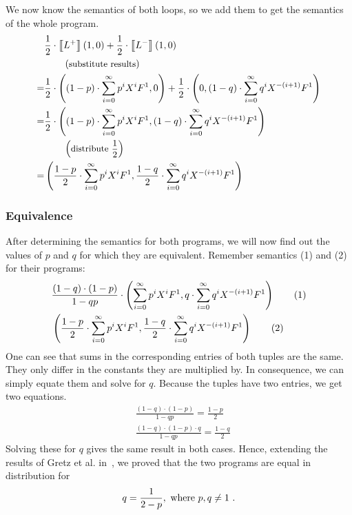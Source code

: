 We now know the semantics of both loops, so we add them to get the semantics of the whole program.
\begin{align*}
	 & \frac{1}{2} \cdot \left\llbracket L^+ \right\rrbracket\left( 1, 0 \right)
		 + \frac{1}{2} \cdot \left\llbracket L^- \right\rrbracket\left( 1, 0 \right) \\
	 & \hspace*{2em} \left(\text{\small substitute results}\right) \\
	=& \frac{1}{2} \cdot \left( (1-p) \cdot \sum_{i=0}^{\infty} p^i X^i F^1, 0 \right)
		+ \frac{1}{2} \cdot \left( 0, (1-q) \cdot \sum_{i=0}^{\infty} q^i X^{-(i+1)} F^1 \right) \\
	=& \frac{1}{2} \cdot \left( (1-p) \cdot \sum_{i=0}^{\infty} p^i X^i F^1,
			(1-q) \cdot \sum_{i=0}^{\infty} q^i X^{-(i+1)} F^1 \right) \\
	 & \hspace*{2em} \left(\text{\small distribute $\frac{1}{2}$}\right) \\
	=& \left( \frac{1-p}{2} \cdot \sum_{i=0}^{\infty} p^i X^i F^1,
		\frac{1-q}{2} \cdot \sum_{i=0}^{\infty} q^i X^{-(i+1)} F^1 \right)
\end{align*}

\subsubsection*{Equivalence}
After determining the semantics for both programs, we will now find out the values of $p$ and $q$ for which they are equivalent.
Remember semantics (1) and (2) for their programs:
\begin{align*}
	& \frac{(1-q) \cdot (1-p)}{1-qp} \cdot
		\left(  \sum_{i=0}^{\infty} p^i X^i F^1,
			q \cdot \sum_{i=0}^{\infty} q^i X^{-(i+1)} F^1 \right) \tag{1} \\
	& \left( \frac{1-p}{2} \cdot \sum_{i=0}^{\infty} p^i X^i F^1,
		\frac{1-q}{2} \cdot \sum_{i=0}^{\infty} q^i X^{-(i+1)} F^1 \right) \tag{2}
\end{align*}
One can see that sums in the corresponding entries of both tuples are the same.
They only differ in the constants they are multiplied by.
In consequence, we can simply equate them and solve for $q$.
Because the tuples have two entries, we get two equations.
\begin{align}
	& \frac{(1-q) \cdot (1-p)}{1-qp} = \frac{1-p}{2} \tag{1} \\
	& \frac{(1-q) \cdot (1-p) \cdot q}{1-qp} = \frac{1-q}{2} \tag{2}
\end{align}
Solving these for $q$ gives the same result in both cases.
Hence, extending the results of Gretz et al. in~\cite{gretz:prinsys}, we proved that the two programs are equal in distribution for
\[ q = \frac{1}{2 - p} , \text{ where } p, q \neq 1\ . \]
